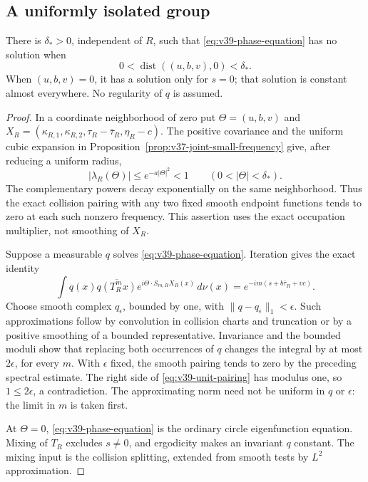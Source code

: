 \subsection{A uniformly isolated group}
\begin{lemma}
\label{lem:v39-local-phase-exclusion}
There is $\delta_*>0$, independent of $R$, such that
\eqref{eq:v39-phase-equation} has no solution when
\[
 0<\operatorname{dist}((u,b,v),0)<\delta_*.
\]
When $(u,b,v)=0$, it has a solution only for $s=0$; that solution is
constant almost everywhere. No regularity of $q$ is assumed.
\end{lemma}
\begin{proof}
In a coordinate neighborhood of zero put $\Theta=(u,b,v)$ and
$X_R=(\kappa_{R,1},\kappa_{R,2},\tau_R-\bar\tau_R,\eta_R-c)$.
The positive covariance and the uniform cubic expansion in
Proposition~\ref{prop:v37-joint-small-frequency} give, after reducing a
uniform radius,
\[
 |\lambda_R(\Theta)|\le e^{-a|\Theta|^2}<1
 \qquad(0<|\Theta|<\delta_*).
\]
The complementary powers decay exponentially on the same neighborhood.
Thus the exact collision pairing with any two fixed smooth endpoint
functions tends to zero at each such nonzero frequency. This assertion
uses the exact occupation multiplier, not smoothing of $X_R$.

Suppose a measurable $q$ solves \eqref{eq:v39-phase-equation}. Iteration
gives the exact identity
\begin{equation}\label{eq:v39-unit-pairing}
 \int q(x)\overline{q(T_R^m x)}
       e^{i\Theta\cdot S_{m,R}X_R(x)}\,d\nu(x)
       =e^{-im(s+b\bar\tau_R+vc)}.
\end{equation}
Choose smooth complex $q_\epsilon$, bounded by one, with
$\|q-q_\epsilon\|_1<\epsilon$. Such approximations follow by
convolution in collision charts and truncation or by a positive
smoothing of a bounded representative. Invariance and the bounded
moduli show that replacing both occurrences of $q$ changes the
integral by at most $2\epsilon$, for every $m$. With $\epsilon$ fixed,
the smooth pairing tends to zero by the preceding spectral estimate.
The right side of \eqref{eq:v39-unit-pairing} has modulus one, so
$1\le2\epsilon$, a contradiction. The approximating norm need not be
uniform in $q$ or $\epsilon$: the limit in $m$ is taken first.

At $\Theta=0$, \eqref{eq:v39-phase-equation} is the ordinary circle
eigenfunction equation. Mixing of $T_R$ excludes $s\ne0$, and
ergodicity makes an invariant $q$ constant. The mixing input is the
collision splitting, extended from smooth tests by $L^2$ approximation.
\end{proof}


